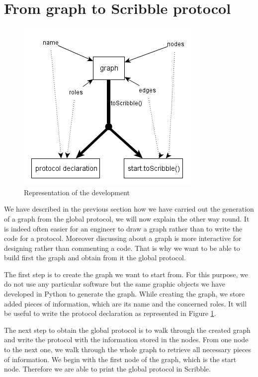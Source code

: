 \documentclass[a4paper,11pt,twoside]{report}
\begin{document}
\section{From graph to Scribble protocol}
\begin{figure}[h]
\begin{center}
\includegraphics[scale=0.7]{graphtoscr}
\end{center}
\caption{Representation of the development}
\label{fig:graphtoscr}
\end{figure}

We have described in the previous section how we have carried out the generation of a graph from the global protocol, we will now explain the other way round. It is indeed often easier for an engineer to draw a graph rather than to write the code for a protocol. Moreover discussing about a graph is more interactive for designing rather than commenting a code. That is why we want to be able to build first the graph and obtain from it the global protocol.

The first step is to create the graph we want to start from. For this purpose, we do not use any particular software but the same graphic objects we have developed in Python to generate the graph. While creating the graph, we store added pieces of information, which are its name and the concerned roles. It will be useful to write the protocol declaration as represented in Figure \ref{fig:graphtoscr}.

The next step to obtain the global protocol is to walk through the created graph and write the protocol with the information stored in the nodes. From one node to the next one, we walk through the whole graph to retrieve all necessary pieces of information. We begin with the first node of the graph, which is the start node. Therefore we are able to print the global protocol in Scribble. 
\end{document}
